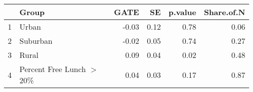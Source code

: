 \begin{tabular}{rlrrrr}
  \hline
 & Group & GATE & SE & p.value & Share.of.N \\ 
  \hline
1 & Urban & -0.03 & 0.12 & 0.78 & 0.06 \\ 
  2 & Suburban & -0.02 & 0.05 & 0.74 & 0.27 \\ 
  3 & Rural & 0.09 & 0.04 & 0.02 & 0.48 \\ 
  4 & Percent Free Lunch $>$ 20\% & 0.04 & 0.03 & 0.17 & 0.87 \\ 
   \hline
\end{tabular}
